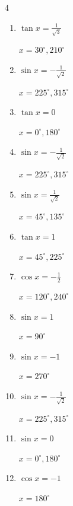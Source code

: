 \begin{multicols}{4}
\begin{enumerate}
  \item $\displaystyle \tan{x}  = \frac{1}{\sqrt{3}}$

        $\displaystyle x = 30^{\circ} , 210^{\circ}$

  \item $\displaystyle \sin{x}  = -\frac{1}{\sqrt{2}}$

        $\displaystyle x = 225^{\circ} , 315^{\circ}$

  \item $\displaystyle \tan{x}  = 0$

        $\displaystyle x = 0^{\circ} , 180^{\circ}$

  \item $\displaystyle \sin{x}  = -\frac{1}{\sqrt{2}}$

        $\displaystyle x = 225^{\circ} , 315^{\circ}$

  \item $\displaystyle \sin{x}  = \frac{1}{\sqrt{2}}$

        $\displaystyle x = 45^{\circ} , 135^{\circ}$

  \item $\displaystyle \tan{x}  = 1$

        $\displaystyle x = 45^{\circ} , 225^{\circ}$

  \item $\displaystyle \cos{x}  = -\frac{1}{2}$

        $\displaystyle x = 120^{\circ} , 240^{\circ}$

  \item $\displaystyle \sin{x}  = 1$

        $\displaystyle x = 90^{\circ}$

  \item $\displaystyle \sin{x}  = -1$

        $\displaystyle x = 270^{\circ}$

  \item $\displaystyle \sin{x}  = -\frac{1}{\sqrt{2}}$

        $\displaystyle x = 225^{\circ} , 315^{\circ}$

  \item $\displaystyle \sin{x}  = 0$

        $\displaystyle x = 0^{\circ} , 180^{\circ}$

  \item $\displaystyle \cos{x}  = -1$

        $\displaystyle x = 180^{\circ}$


\end{enumerate}
\end{multicols}
